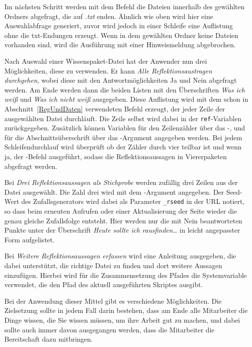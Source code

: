 Im nächsten Schritt werden mit dem Befehl  die Dateien innerhalb des gewählten Ordners abgefragt, die auf \emph{.txt} enden. Ähnlich wie oben wird hier eine Auswahlabfrage generiert, zuvor wird jedoch in einer Schleife eine Auf\-lis\-tung ohne die txt-Endungen erzeugt. Wenn in dem gewählten Ordner keine Dateien vorhanden sind, wird die Ausführung mit einer Hinweismeldung abgebrochen.

Nach Auswahl einer Wissenspaket-Datei hat der Anwender nun drei Möglichkeiten, diese zu verwenden. Er kann \emph{Alle Reflektionsaustragen durchgehen}, wobei diese mit den Antwortmöglichkeiten Ja und Nein abgefragt werden. Am Ende werden dann die beiden Listen mit den Überschriften \emph{Was ich weiß} und \emph{Was ich nicht weiß} ausgegeben. Diese Auf\-lis\-tung wird mit dem schon in Abschnitt~\ref{RegUndDaten} verwendeten Befehl  erzeugt, der jeder Zeile der ausgewählten Datei durchläuft. Die Zeile selbst wird dabei in der \verb|ref|-Variablen zurückgegeben. Zusätzlich können Variablen für den Zeilenzähler über das -, und für die Abschnittsüberschrift über das -Argument angegeben werden. Bei jedem Schleifendurchlauf wird überprüft ob der Zähler durch vier teilbar ist und wenn ja, der -Befehl ausgeführt, sodass die Reflektionsaussagen in Viererpaketen abgefragt werden.

Bei \emph{Drei Reflektionsaussagen als Stichprobe} werden zufällig drei Zeilen aus der Datei ausgewählt. Die Zahl drei wird mit dem -Argument angegeben. Der Seed-Wert des Zufallsgenerators wird dabei als Parameter \verb|_rseed| in der URL notiert, so dass beim erneuten Aufrufen oder einer Aktualisierung der Seite wieder die genau gleiche Zufallsfolge entsteht. Hier werden nur die mit Nein beantworteten Punkte unter der Überschrift \emph{Heute sollte ich rausfinden\dots} in leicht angepasster Form aufgelistet.

Bei \emph{Weitere Reflektionsaussagen erfassen} wird eine Anleitung ausgegeben, die dabei unterstützt, die richtige Datei zu finden und dort weitere Aussagen einzufügen. Hierbei wird für die Zusammensetzung des Pfades die Systemvariable  verwendet, die den Pfad des aktuell ausgeführten Skriptes ausgibt.

Bei der Anwendung dieser Mittel gibt es verschiedene Möglichkeiten. Die Zielsetzung sollte in jedem Fall darin bestehen, dass am Ende alle Mitarbeiter die Dinge wissen, die Sie wissen müssen, um ihre Arbeit gut zu machen, und dabei sollte auch immer davon ausgegangen werden, dass die Mitarbeiter die Bereitschaft dazu mitbringen.

